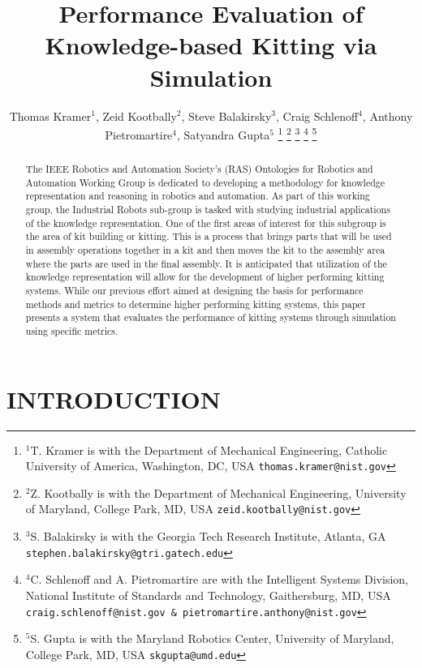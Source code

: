 \documentclass[letterpaper, 10 pt, conference]{ieeeconf}  %
\title{\LARGE \bf
Performance Evaluation of Knowledge-based Kitting via Simulation
}
\author{Thomas Kramer$^{1}$, Zeid Kootbally$^{2}$, Steve Balakirsky$^{3}$, Craig Schlenoff$^{4}$, Anthony Pietromartire$^{4}$, Satyandra Gupta$^{5}$%
\thanks{$^{1}$T. Kramer is with the Department of Mechanical Engineering, Catholic University of America, Washington, DC, USA
        {\tt\small thomas.kramer@nist.gov}}%
\thanks{$^{2}$Z. Kootbally is with the Department of Mechanical Engineering, University of Maryland, College Park, MD, USA
        {\tt\small zeid.kootbally@nist.gov}}
\thanks{$^{3}$S. Balakirsky is with the Georgia Tech Research Institute, Atlanta, GA
{\tt\small stephen.balakirsky@gtri.gatech.edu}}%
\thanks{$^{4}$C. Schlenoff and A. Pietromartire are with the Intelligent Systems Division,
National Institute of Standards and Technology, Gaithersburg, MD, USA
{\tt\small craig.schlenoff@nist.gov \& pietromartire.anthony@nist.gov}}%
\thanks{$^{5}$S. Gupta is with the Maryland Robotics Center, University of Maryland,
College Park, MD, USA
        {\tt\small skgupta@umd.edu}}%
}
\begin{document}
\maketitle
\thispagestyle{empty}
\pagestyle{empty}


\begin{abstract}

The IEEE Robotics and Automation Society's (RAS) Ontologies for Robotics
and Automation Working Group is dedicated to developing a methodology for
knowledge representation and reasoning in robotics and automation. As part
of this working group, the Industrial Robots sub-group is tasked with
studying industrial applications of the knowledge representation. One of
the first areas of interest for this subgroup is the area of kit building
or kitting. This is a process that brings parts that will be used in
assembly operations together in a kit and then moves the kit to the
assembly area where the parts are used in the final assembly. It is
anticipated that utilization of the knowledge representation will allow for
the development of higher performing kitting systems. While our previous
effort aimed at designing the basis for performance methods and metrics to
determine higher performing kitting systems, this paper presents a system
that evaluates the performance of kitting systems through simulation using
specific metrics.

\end{abstract}



\section{INTRODUCTION} 
\label{sect:Introduction}



\end{document}
